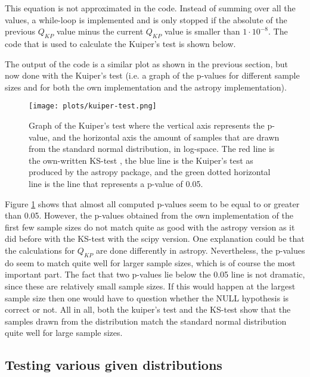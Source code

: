 This equation is not approximated in the code. Instead of summing over all the values, a while-loop is implemented and is only stopped if the absolute of the previous $Q_{KP}$ value minus the current $Q_{KP}$ value is smaller than $1\cdot10^{-8}$. The code that is used to calculate the Kuiper's test is shown below.


The output of the code is a similar plot as shown in the previous section, but now done with the Kuiper's test (i.e. a graph of the p-values for different sample sizes and for both the own implementation and the astropy implementation).
\begin{figure}[h]
\centering
\texttt{[image: plots/kuiper-test.png]}
\caption{Graph of the Kuiper's test where the vertical axis represents the p-value, and the horizontal axis the amount of samples that are drawn from the standard normal distribution, in log-space. The red line is the own-written KS-test , the blue line is the Kuiper's test as produced by the astropy package, and the green dotted horizontal line is the line that represents a p-value of 0.05.}
\label{kuiper}
\end{figure}

Figure \ref{kuiper} shows that almost all computed p-values seem to be equal to or greater than 0.05. However, the p-values obtained from the own implementation of the first few sample sizes do not match quite as good with the astropy version as it did before with the KS-test with the scipy version. One explanation could be that the calculations for $Q_{KP}$ are done differently in astropy. Nevertheless, the p-values do seem to match quite well for larger sample sizes, which is of course the most important part. The fact that two p-values lie below the 0.05 line is not dramatic, since these are relatively small sample sizes. If this would happen at the largest sample size then one would have to question whether the NULL hypothesis is correct or not. All in all, both the kuiper's test and the KS-test show that the samples drawn from the distribution match the standard normal distribution quite well for large sample sizes. 


\subsection{Testing various given distributions}

